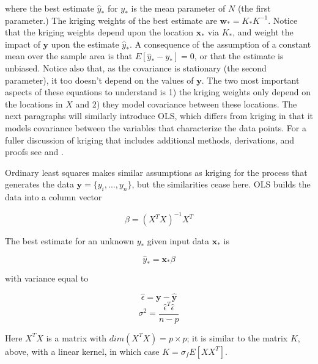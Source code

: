 \documentclass[draft]{article}
\begin{document}
where the best estimate $\hat{y}_*$ for $y_*$ is the mean parameter of $N$ (the first parameter.)  The kriging weights of the best estimate are $\bm{w}_*=K_*K^{-1}$.  Notice that the kriging weights depend upon the location $\bm{x}_*$ via $K_*$, and weight the impact of $\bm{y}$ upon the estimate $\hat{y}_*$.  A consequence of the assumption of a constant mean over the sample area is that $E[\hat{y}_*-y_*]=0$, or that the estimate is unbiased.  Notice also that, as the covariance is stationary (the second parameter), it too doesn't depend on the values of $\bm{y}$.  The two most important aspects of these equations to understand is 1) the kriging weights only depend on the locations in $X$ and 2) they model covariance between these locations.  The next paragraphs will similarly introduce OLS, which differs from kriging in that it models covariance between the variables that characterize the data points.  For a fuller discussion of kriging that includes additional methods, derivations, and proofs see \cite{cressie93} and \cite{rasmussen06}.

Ordinary least squares makes similar assumptions as kriging for the process that generates the data $\bm{y}=\{y_i, ..., y_n\}$, but the similarities cease here.  OLS builds the data into a column vector

\[\beta=(X^TX)^{-1}X^T\]

The best estimate for an unknown $y_*$ given input data $\bm{x}_*$ is

\[\hat{y}_*=\bm{x}_*\beta\]

with variance equal to

\[\hat{\epsilon}=\bm{y}-\bm{\hat{y}}\]
\[\sigma^2=\frac{\hat{\epsilon}^T\hat{\epsilon}}{n-p}\]

Here $X^TX$ is a matrix with $dim(X^TX)=p \times p$; it is similar to the matrix $K$, above, with a linear kernel, in which case $K=\sigma_fE[XX^T]$.
\end{document}
